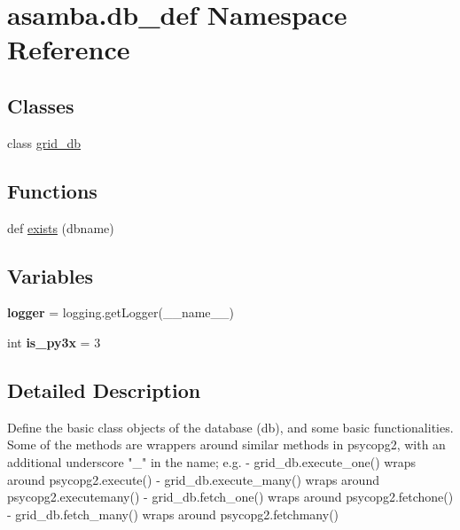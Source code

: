 \hypertarget{namespaceasamba_1_1db__def}{}\section{asamba.\+db\+\_\+def Namespace Reference}
\label{namespaceasamba_1_1db__def}
\subsection*{Classes}
\begin{DoxyCompactItemize}
\item 
class \hyperlink{classasamba_1_1db__def_1_1grid__db}{grid\+\_\+db}
\end{DoxyCompactItemize}
\subsection*{Functions}
\begin{DoxyCompactItemize}
\item 
def \hyperlink{namespaceasamba_1_1db__def_ae036f59b82c15b96d4d833e9f2fa5d95}{exists} (dbname)
\end{DoxyCompactItemize}
\subsection*{Variables}
\begin{DoxyCompactItemize}
\item 
\mbox{\label{namespaceasamba_1_1db__def_a384fe1451672227e44229595c4d6901c}} 
{\bfseries logger} = logging.\+get\+Logger(\+\_\+\+\_\+name\+\_\+\+\_\+)
\item 
\mbox{\label{namespaceasamba_1_1db__def_ac836e2ab6f9a230b10275bd6f9ac29d1}} 
int {\bfseries is\+\_\+py3x} = 3
\end{DoxyCompactItemize}


\subsection{Detailed Description}
\begin{DoxyVerb}Define the basic class objects of the database (db), and some basic functionalities.
Some of the methods are wrappers around similar methods in psycopg2, with an additional
underscore "_" in the name; e.g. 
- grid_db.execute_one() wraps around psycopg2.execute()
- grid_db.execute_many() wraps around psycopg2.executemany()
- grid_db.fetch_one() wraps around psycopg2.fetchone()
- grid_db.fetch_many() wraps around psycopg2.fetchmany()
\end{DoxyVerb}
 

